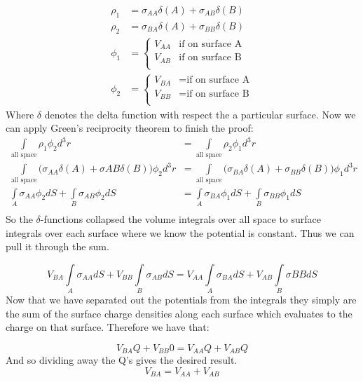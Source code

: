 \documentclass[a4paper, 11pt]{article}
\begin{document}
\begin{align}
	\rho_1 &= \sigma_{AA}\delta(A) + \sigma_{AB}\delta(B) \\ 
	\rho_2 &= \sigma_{BA}\delta(A) + \sigma_{BB}\delta(B) \\
	\phi_1 &= \begin{cases}
	V_{AA} & \text{if on surface A} \\
	V_{AB} & \text{if on surface B} \\
	\end{cases} \\ 
	\phi_2 &= \begin{cases}
	V_{BA} &= \text{if on surface A} \\
	V_{BB} &= \text{if on surface B} \\ 
	\end{cases}
\end{align}
Where $\delta$ denotes the delta function with respect the a particular surface. Now we can apply Green's reciprocity theorem to finish the proof: 
\begin{align*}
	\int\limits_{\text{all space}} \rho_1 \phi_2 d^3r &= 	\int\limits_{\text{all space}} \rho_2 \phi_1 d^3{r}\\
	\int\limits_{\text{all space}} \big(\sigma_{AA}\delta(A) + \sigma{AB}\delta(B) \big)\phi_2 d^3r &= \int\limits_{\text{all space}} \big(\sigma_{BA}\delta(A) + \sigma_{BB}\delta(B) \big)\phi_1 d^3r \\
	\int\limits_A \sigma_{AA}\phi_2 dS + \int\limits_B \sigma_{AB}\phi_2 dS &= \int\limits_A \sigma_{BA}\phi_1 dS + \int\limits_B \sigma_{BB} \phi_1 dS \\ 
\end{align*}
So the $\delta$-functions collapsed the volume integrals over all space to surface integrals over each surface where we know the potential is constant. Thus we can pull it through the sum. 

\begin{equation*}
	V_{BA}\int\limits_A \sigma_{AA}dS + V_{BB}\int\limits_B \sigma_{AB}dS = V_{AA}\int\limits_A \sigma_{BA}dS + V_{AB}\int\limits_B \sigma{BB}dS
\end{equation*}
Now that we have separated out the potentials from the integrals they simply are the sum of the surface charge densities along each surface which evaluates to the charge on that surface. Therefore we have that: 

\begin{equation*}
	V_{BA}Q + V_{BB}0 = V_{AA}Q + V_{AB}Q 
\end{equation*}
And so dividing away the Q's gives the desired result. 
\begin{equation}
	V_{BA} = V_{AA} + V_{AB} 
\end{equation}
\end{document}
